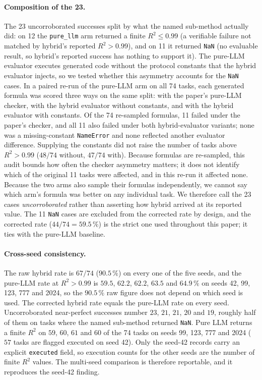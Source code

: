 \documentclass[twoside,11pt]{article}
\newcommand{\Rsq}{R^{2}}
\begin{document}
\paragraph{Composition of the 23.} The 23 uncorroborated
successes split by what the named sub-method actually did: on 12 the
\texttt{pure\_llm} arm returned a finite $\Rsq\le0.99$ (a verifiable
failure not matched by hybrid's reported $\Rsq>0.99$), and on 11 it returned
\texttt{NaN} (no evaluable result, so hybrid's reported success has nothing to
support it). The pure-LLM evaluator executes generated code without the
protocol constants that the hybrid evaluator injects, so we tested whether
this asymmetry accounts for the \texttt{NaN} cases. In a paired re-run of the
pure-LLM arm on all 74 tasks, each generated formula was scored three ways on
the same split: with the paper's pure-LLM checker, with the hybrid evaluator
without constants, and with the hybrid evaluator with constants. Of the 74
re-sampled formulas, 11 failed under the paper's checker, and all 11 also
failed under both hybrid-evaluator variants; none was a missing-constant
\texttt{NameError} and none reflected another evaluator difference.
Supplying the constants did not raise the number of tasks above
$\Rsq>0.99$ ($48/74$ without, $47/74$ with). Because formulas are
re-sampled, this audit bounds how often the checker asymmetry matters; it does
not identify which of the original 11 tasks were affected, and in this re-run
it affected none. Because the two arms also sample their formulas independently,
we cannot say which arm's formula was better on any individual task. We
therefore call the 23 cases \emph{uncorroborated} rather than asserting how
hybrid arrived at its reported value. The 11 \texttt{NaN} cases are excluded
from the corrected rate by design, and the corrected rate
($44/74 = 59.5\,\%$) is the strict one used throughout this paper; it ties
with the pure-LLM baseline.

\paragraph{Cross-seed consistency.} The raw hybrid rate is $67/74$ ($90.5\,\%$) on every one of the five seeds, and the pure-LLM rate at $\Rsq>0.99$ is $59.5$, $62.2$, $62.2$, $63.5$ and $64.9\,\%$ on seeds 42, 99, 123, 777 and 2024, so the $90.5\,\%$ raw figure does not depend on which seed is used. The corrected hybrid rate equals the pure-LLM rate on every seed. Uncorroborated near-perfect successes number $23$, $21$, $21$, $20$ and $19$, roughly half of them on tasks where the named sub-method returned \texttt{NaN}. Pure LLM returns a finite $\Rsq$ on $59$, $60$, $61$ and $60$ of the 74 tasks on seeds 99, 123, 777 and 2024 ($57$ tasks are flagged executed on seed 42). Only the seed-42 records carry an explicit \texttt{executed} field, so execution counts for the other seeds are the number of finite $\Rsq$ values. The multi-seed comparison is therefore reportable, and it reproduces the seed-42 finding.
\end{document}
